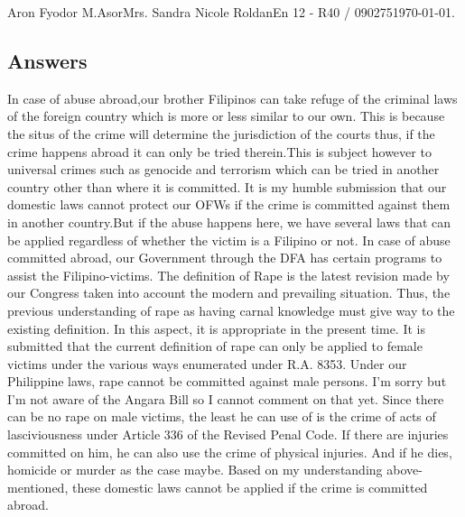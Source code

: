 \documentclass[12pt,letterpaper]{article}
\begin{document}
\begin{mla}{Aron Fyodor M.}{Asor}{Mrs. Sandra Nicole Roldan}{En 12 - R40 / 090275}{\today}{.}



\subsection{Answers}
\begin{outline}[enumerate]
	\1  In case of abuse abroad,our brother Filipinos can take refuge of the criminal laws of the foreign country which is more or less similar to our own.  This is because the situs of the crime will determine the jurisdiction of the courts   thus, if the crime happens abroad it can only be tried therein.This is subject however to universal crimes such as genocide and terrorism which can be tried in another country other than where it is committed. 
		\2 It is my humble submission that our domestic laws cannot protect our OFWs if the crime is committed against them in another country.But if the abuse happens here, we have several laws that can be applied regardless of whether the victim is a Filipino or not.
		\2 In case of abuse committed abroad, our Government through the DFA has certain programs to assist the Filipino-victims.   
	\1 The definition of Rape is the latest revision made by our Congress taken into account the modern and prevailing situation. Thus, the previous understanding of rape as having carnal knowledge must give way to the existing definition. In this aspect, it is appropriate in the present time.
	\1  It is submitted that the current definition of rape can only be applied to female victims under the various ways enumerated under R.A. 8353. Under our Philippine laws, rape cannot be committed against male persons.
	\1 I'm sorry but I'm not aware of the Angara Bill so I cannot comment on that yet.
	\1 Since there can be no rape on male victims, the least he can use of is the crime of acts of lasciviousness under Article 336 of the Revised Penal Code. If there are injuries committed on him, he can also use the crime of physical injuries. And if he dies, homicide or murder as the case maybe.
	\1 Based on my understanding above-mentioned, these domestic laws cannot be applied if the crime is committed abroad. 
\end{outline}
\end{mla}
\end{document}
